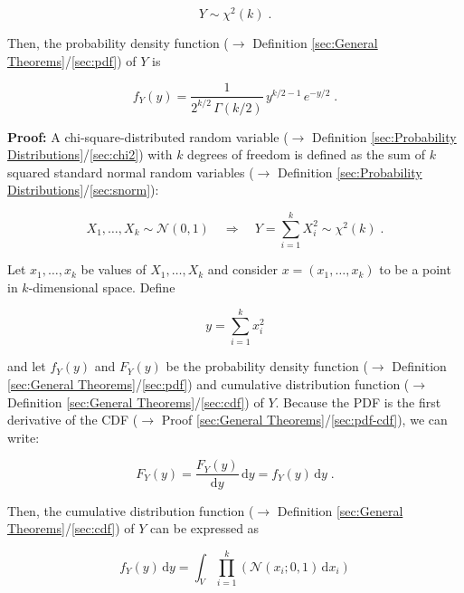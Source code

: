 \documentclass[a4paper,12pt,twoside]{book}
\begin{document}
\begin{equation} \label{eq:chi2-pdf-chi2}
Y \sim \chi^{2}(k) \; .
\end{equation}

Then, the probability density function ($\rightarrow$ Definition \ref{sec:General Theorems}/\ref{sec:pdf}) of $Y$ is

\begin{equation} \label{eq:chi2-pdf-chi2-pdf}
f_Y(y) = \frac{1}{2^{k/2} \, \Gamma (k/2)} \, y^{k/2-1} \, e^{-y/2} \; .
\end{equation}


\vspace{1em}
\textbf{Proof:} A chi-square-distributed random variable ($\rightarrow$ Definition \ref{sec:Probability Distributions}/\ref{sec:chi2}) with $k$ degrees of freedom is defined as the sum of $k$ squared standard normal random variables ($\rightarrow$ Definition \ref{sec:Probability Distributions}/\ref{sec:snorm}):

\begin{equation} \label{eq:chi2-pdf-chi2-def}
X_1, \ldots, X_k \sim \mathcal{N}(0,1) \quad \Rightarrow \quad Y = \sum_{i=1}^{k} X_i^2 \sim \chi^{2}(k) \; .
\end{equation}

Let $x_1, \ldots, x_k$ be values of $X_1, \ldots, X_k$ and consider $x = \left( x_1, \ldots, x_k \right)$ to be a point in $k$-dimensional space. Define

\begin{equation} \label{eq:chi2-pdf-y-x}
y = \sum_{i=1}^{k} x_i^2
\end{equation}

and let $f_Y(y)$ and $F_Y(y)$ be the probability density function ($\rightarrow$ Definition \ref{sec:General Theorems}/\ref{sec:pdf}) and cumulative distribution function ($\rightarrow$ Definition \ref{sec:General Theorems}/\ref{sec:cdf}) of $Y$. Because the PDF is the first derivative of the CDF ($\rightarrow$ Proof \ref{sec:General Theorems}/\ref{sec:pdf-cdf}), we can write:

\begin{equation} \label{eq:chi2-pdf-y-pdf-s0}
F_Y(y) = \frac{F_Y(y)}{\mathrm{d}y} \, \mathrm{d}y = f_Y(y) \, \mathrm{d}y \; .
\end{equation}

Then, the cumulative distribution function ($\rightarrow$ Definition \ref{sec:General Theorems}/\ref{sec:cdf}) of $Y$ can be expressed as

\begin{equation} \label{eq:chi2-pdf-y-cdf-s1}
f_Y(y) \, \mathrm{d}y = \int_{V} \prod_{i=1}^{k} \left( \mathcal{N}(x_i; 0, 1) \, \mathrm{d}x_i \right)
\end{equation}
\end{document}
